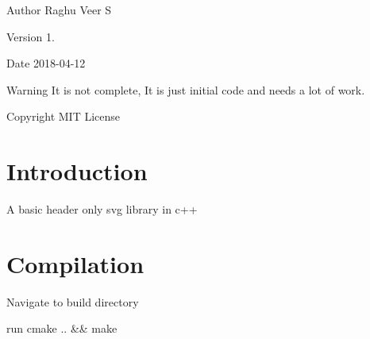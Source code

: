 \begin{DoxyAuthor}{Author}
Raghu Veer S 
\end{DoxyAuthor}
\begin{DoxyVersion}{Version}
1. 
\end{DoxyVersion}
\begin{DoxyDate}{Date}
2018-\/04-\/12 
\end{DoxyDate}
\begin{DoxyWarning}{Warning}
It is not complete, It is just initial code and needs a lot of work. 
\end{DoxyWarning}
\begin{DoxyCopyright}{Copyright}
M\+IT License
\end{DoxyCopyright}
\hypertarget{index_intro_sec}{}\section{Introduction}\label{index_intro_sec}
A basic header only svg library in c++ \hypertarget{index_compile_sec}{}\section{Compilation}\label{index_compile_sec}

\begin{DoxyEnumerate}
\item Navigate to build directory
\item run cmake .. \&\& make 
\end{DoxyEnumerate}